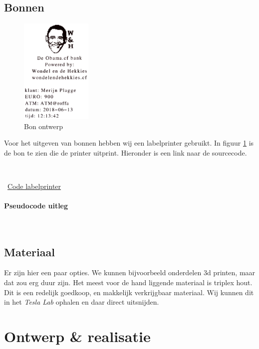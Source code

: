 \documentclass{article}
\begin{document}
\newpage
\subsection{Bonnen}

\begin{figure}[H]
        \centering
        \includegraphics[height=2.0in]{obama_bon.pdf}
       \caption{Bon ontwerp}
       \label{fig: Bon ontwerp}
\end{figure}

Voor het uitgeven van bonnen hebben wij een labelprinter gebruikt.
In figuur \ref{fig: Bon ontwerp} is de bon te zien die de printer uitprint.
Hieronder is een link naar de sourcecode.

\vspace{1mm}\

\Mundus~\href{https://github.com/Gewad/Project4Bankalicious/tree/master/bonnetjesPrinten}{Code labelprinter}

\paragraph{Pseudocode uitleg}\ 



\newpage

\subsection{Materiaal}

Er zijn hier een paar opties.
We kunnen bijvoorbeeld onderdelen 3d printen, maar dat zou erg duur zijn.
Het meest voor de hand liggende materiaal is triplex hout.
Dit is een redelijk goedkoop, en makkelijk verkrijgbaar materiaal.
Wij kunnen dit in het \emph{Tesla Lab} ophalen en daar direct uitsnijden.

\newpage

\section{Ontwerp \& realisatie}
\end{document}
